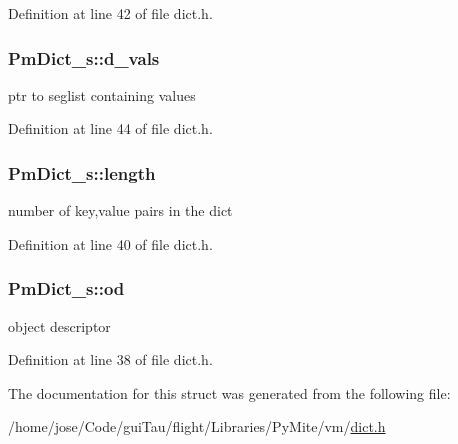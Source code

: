 Definition at line 42 of file dict.\-h.

\hypertarget{struct_pm_dict__s_a90dac7a83c7cdffe63ef92317093a955}{
\subsubsection[{d\-\_\-vals}]{ Pm\-Dict\-\_\-s\-::d\-\_\-vals}}\label{struct_pm_dict__s_a90dac7a83c7cdffe63ef92317093a955}
ptr to seglist containing values 

Definition at line 44 of file dict.\-h.

\hypertarget{struct_pm_dict__s_ab892163e496cd52f2a5a40ca46341cc3}{
\subsubsection[{length}]{ Pm\-Dict\-\_\-s\-::length}}\label{struct_pm_dict__s_ab892163e496cd52f2a5a40ca46341cc3}
number of key,value pairs in the dict 

Definition at line 40 of file dict.\-h.

\hypertarget{struct_pm_dict__s_a601bf9411e40c8878b2fb4345af7e9b7}{
\subsubsection[{od}]{ Pm\-Dict\-\_\-s\-::od}}\label{struct_pm_dict__s_a601bf9411e40c8878b2fb4345af7e9b7}
object descriptor 

Definition at line 38 of file dict.\-h.



The documentation for this struct was generated from the following file\-:\begin{DoxyCompactItemize}
\item 
/home/jose/\-Code/gui\-Tau/flight/\-Libraries/\-Py\-Mite/vm/\hyperlink{dict_8h}{dict.\-h}\end{DoxyCompactItemize}
